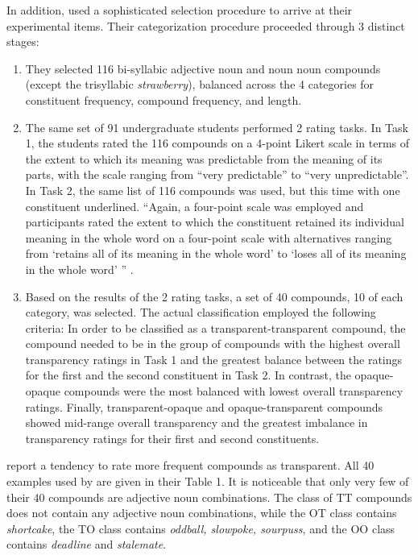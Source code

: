 In addition, \citet{Libbenetal:2003} used a sophisticated
selection procedure to arrive at their experimental items. Their categorization procedure proceeded through
3 distinct stages:
\begin{enumerate}
\item They selected 116 bi-syllabic adjective noun and noun noun
  com\-pounds (except the trisyllabic \emph{strawberry}), balanced across the
  4 categories for constituent frequency, compound frequency, and
    length. %
  \item The same set of 91 undergraduate
    students performed 2 rating tasks. In Task 1, the students rated the 116 compounds on a
    4-point Likert scale in terms of the extent to which
    its meaning was predictable from the meaning of its parts, with the scale
    ranging from ``very predictable'' to ``very unpredictable''. In Task 2, the
    same list of 116 compounds was used, but this time with one
    constituent underlined. ``Again, a four-point scale was employed
and participants rated the extent to which the constituent retained its individual
meaning in the whole word on a four-point scale with alternatives ranging from
`retains all of its meaning in the whole word' to `loses all of its meaning in the whole
word' '' \citep[54]{Libbenetal:2003}. 

  \item Based on the results of the 2 rating tasks, a set of 40 compounds, 10
    of each category, was
    selected. The actual classification employed the following criteria: In
    order to be classified as a transparent-transparent compound, the compound
    needed to be in the group of compounds with the highest overall
    transparency ratings in Task 1 and the greatest balance between the
    ratings for the first and the second constituent in Task 2. In contrast,
    the opaque-opaque compounds were the most balanced with lowest overall
    transparency ratings. Finally, transparent-opaque and opaque-transparent
    compounds showed  mid-range overall transparency and the greatest
    imbalance in transparency ratings for their first and second constituents.

\end{enumerate}
\citet{Libbenetal:2003} report a tendency to rate more frequent compounds as
transparent. %
All 40 examples used by \citet{Libbenetal:2003} are given in their
Table 1. It is noticeable that only
very few of their 40 compounds are adjective noun combinations. The class of TT compounds does not
contain any adjective noun combinations, while the OT class contains \emph{shortcake}, the TO
class contains \emph{oddball, slowpoke, sourpuss}, and the OO class contains
\emph{deadline} and \emph{stalemate}. 

